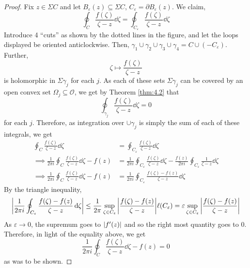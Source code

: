 \documentclass[../ComplexAnalysis_Notes.tex]{subfiles}
\begin{document}
\begin{proof} 
  Fix \( z \in \Sigma C \) and let \( B_\varepsilon (z) \subseteq \Sigma C \), \( C_\varepsilon = \partial B_\varepsilon(z) \). We claim,
  \[ 
   \oint_C \frac{f(\zeta)}{\zeta-z} \dd{\zeta} = \oint_{C_\varepsilon} \frac{f(\zeta)}{\zeta-z} \dd{\zeta}
   \]
Introduce 4 ``cuts'' as shown by the dotted lines in the figure, and let the loops displayed be oriented anticlockwise. Then, \( \gamma_1 \cup \gamma_2 \cup \gamma_3 \cup \gamma_4 = C  \cup (-C_\varepsilon) \). Further, 
\[ 
 \zeta \mapsto \frac{f(\zeta)}{\zeta-z} 
 \]
is holomorphic in \( \Sigma \gamma_j \) for each \( j \). As each of these sets \( \Sigma \gamma_j \) can be covered by an open convex set \( \Omega_j \subseteq \mathcal{O} \), we get by Theorem \ref{thm:4.2} that
\[ 
 \oint_{\gamma_j} \frac{f(\zeta)}{\zeta-z} \dd{\zeta}= 0
 \]
for each \( j \). Therefore, as integration over \( \cup \gamma_j \) is simply the sum of each of these integrals, we get
\begin{align*}
   \oint_C \frac{f(\zeta)}{\zeta-z} \dd{\zeta} 
   &= \oint_{C_\varepsilon} \frac{f(\zeta)}{\zeta-z} \dd{\zeta} \\
   \implies \frac{1}{2\pi i}\oint_C \frac{f(\zeta)}{\zeta-z} \dd{\zeta} -f(z)
   &= \frac{1}{2\pi i}\oint_{C_\varepsilon} \frac{f(\zeta)}{\zeta-z} \dd{\zeta} 
   - \frac{f(z)}{2\pi i}\oint_{C_\varepsilon} \frac{1}{\zeta-z} \dd{\zeta} \\
   \implies \frac{1}{2\pi i}\oint_C \frac{f(\zeta)}{\zeta-z} \dd{\zeta} -f(z)
   &= \frac{1}{2\pi i}\oint_{C_\varepsilon} \frac{f(\zeta)-f(z)}{\zeta-z} \dd{\zeta}
\end{align*}
By the triangle inequality,
\[ 
  \abs{\frac{1}{2\pi i}\oint_{C_\varepsilon} \frac{f(\zeta)-f(z)}{\zeta-z} \dd{\zeta}} \leq \frac{1}{2\pi} \sup_{\zeta \in C_\varepsilon} \abs{\frac{f(\zeta)-f(z)}{\zeta-z}} \ell(C_\varepsilon) = \varepsilon \sup_{\zeta \in C_\varepsilon} \abs{\frac{f(\zeta)-f(z)}{\zeta-z}}
 \]
As \( \varepsilon \to 0 \), the supremum goes to \( \abs{f'(z)} \) and so the right most quantity goes to 0. Therefore, in light of the equality above, we get
\[ 
  \frac{1}{2\pi i}\oint_C \frac{f(\zeta)}{\zeta-z} \dd{\zeta} -f(z) = 0
 \]
 as was to be shown.
\end{proof}
\end{document}
